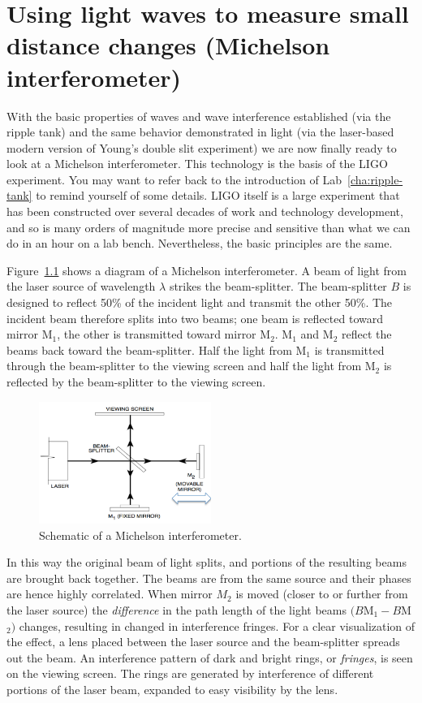 \chapter{Using light waves to measure small distance changes (Michelson interferometer)}

With the basic properties of waves and wave interference established (via the ripple tank) and the same behavior
demonstrated in light (via the laser-based modern version of Young's double slit experiment) we are now finally ready to
look at a Michelson interferometer. This technology is the basis of the LIGO experiment. You may want to refer back to
the introduction of Lab~\ref{cha:ripple-tank} to remind yourself of some details. LIGO itself is a large experiment that has
been constructed over several decades of work and technology development, and so is many orders of magnitude more
precise and sensitive than what we can do in an hour on a lab bench. Nevertheless, the basic principles are the same.

Figure~\ref{mi:fig:schematic} shows a diagram of a Michelson interferometer. A beam of light from the laser source of wavelength $\lambda$
strikes the beam-splitter. The beam-splitter $B$ is designed to reflect 50\% of the incident light and transmit the other 50\%.
The incident beam therefore splits into two beams; one beam is reflected toward mirror M$_1$, the other is transmitted
toward mirror M$_2$. M$_1$ and M$_2$ reflect the beams back toward the beam-splitter. Half the light from M$_1$ is transmitted
through the beam-splitter to the viewing screen and half the light from M$_2$ is reflected by the beam-splitter to the
viewing screen.

\begin{figure}
	\centering
	\includegraphics[width=0.5\textwidth]{michelson-interferometer/michelson-schematic.png}
	\caption{Schematic of a Michelson interferometer.}\label{mi:fig:schematic}
\end{figure}

In this way the original beam of light splits, and portions of the resulting beams are brought back together. The
beams are from the same source and their phases are hence highly correlated. When mirror $M_2$ is moved (closer to or
further from the laser source) the \textit{difference} in the path length of the light beams $(B$M$_1 - B$M$_2)$ changes, resulting in
changed in interference fringes. For a clear visualization of the effect, a lens placed between the laser source and the
beam-splitter spreads out the beam. An interference pattern of dark and bright rings, or \textit{fringes}, is seen on the
viewing screen. The rings are generated by interference of different portions of the laser beam, expanded to easy
visibility by the lens.


